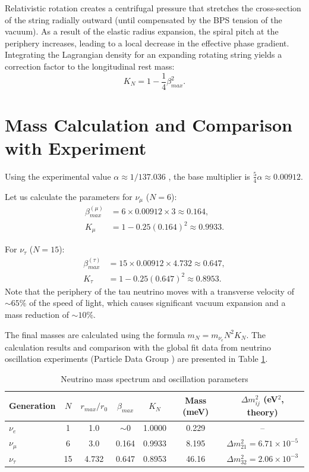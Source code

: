 \documentclass[12pt,a4paper]{article}
\begin{document}
	Relativistic rotation creates a centrifugal pressure that stretches the cross-section of the string radially outward (until compensated by the BPS tension of the vacuum). As a result of the elastic radius expansion, the spiral pitch at the periphery increases, leading to a local decrease in the effective phase gradient. Integrating the Lagrangian density for an expanding rotating string yields a correction factor to the longitudinal rest mass:
	\begin{equation}
		K_N = 1 - \frac{1}{4} \beta_{max}^2.
	\end{equation}
	
	\section{Mass Calculation and Comparison with Experiment}
	
	Using the experimental value $\alpha \approx 1/137.036$ \cite{codata2018}, the base multiplier is $\frac{5}{4}\alpha \approx 0.00912$. 
	
	Let us calculate the parameters for $\nu_\mu$ ($N=6$):
	\begin{align}
		\beta_{max}^{(\mu)} &= 6 \times 0.00912 \times 3 \approx 0.164, \\
		K_\mu &= 1 - 0.25 (0.164)^2 \approx 0.9933.
	\end{align}
	
	For $\nu_\tau$ ($N=15$):
	\begin{align}
		\beta_{max}^{(\tau)} &= 15 \times 0.00912 \times 4.732 \approx 0.647, \\
		K_\tau &= 1 - 0.25 (0.647)^2 \approx 0.8953.
	\end{align}
	Note that the periphery of the tau neutrino moves with a transverse velocity of $\sim 65\%$ of the speed of light, which causes significant vacuum expansion and a mass reduction of $\sim 10\%$.
	
	The final masses are calculated using the formula $m_N = m_{\nu_e} N^2 K_N$. The calculation results and comparison with the global fit data from neutrino oscillation experiments (Particle Data Group \cite{pdg2024}) are presented in Table \ref{tab:neutrino}.
	
	\begin{table}[h]
		\centering
		\caption{Neutrino mass spectrum and oscillation parameters}
		\label{tab:neutrino}
		\renewcommand{\arraystretch}{1.3}
		\begin{tabular}{lcccccc}
			\toprule
			Generation & $N$ & $r_{max}/r_0$ & $\beta_{max}$ & $K_N$ & Mass (meV) & $\Delta m^2_{ij}$ (eV$^2$, theory) \\
			\midrule
			$\nu_e$   & 1   & 1.0     & $\sim 0$ & 1.0000 & 0.229 & -- \\
			$\nu_\mu$ & 6   & 3.0     & 0.164    & 0.9933 & 8.195 & $\Delta m^2_{21} = 6.71 \times 10^{-5}$ \\
			$\nu_\tau$ & 15 & 4.732   & 0.647    & 0.8953 & 46.16 & $\Delta m^2_{32} = 2.06 \times 10^{-3}$ \\
			\bottomrule
		\end{tabular}
	\end{table}
	
\end{document}
